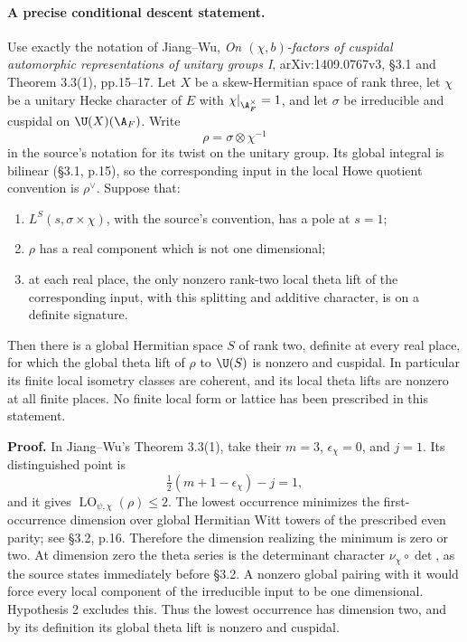 \documentclass[11pt]{article}
\theoremstyle{definition}\newtheorem{definition}[theorem]{Definition}\newtheorem{remark}[theorem]{Remark}
\begin{document}
\paragraph{A precise conditional descent statement.}
Use exactly the notation of Jiang--Wu, \emph{On $(\chi,b)$-factors of cuspidal automorphic representations of unitary groups I}, arXiv:1409.0767v3, \S3.1 and Theorem 3.3(1), pp.15--17. Let $X$ be a skew-Hermitian space of rank three, let $\chi$ be a unitary Hecke character of $E$ with $\chi|_{\A_F^\times}=1$, and let $\sigma$ be irreducible and cuspidal on $\U(X)(\A_F)$. Write
\[
 \rho=\sigma\otimes\chi^{-1}
 \tag{B16a}
\]
in the source's notation for its twist on the unitary group. Its global integral is bilinear (\S3.1, p.15), so the corresponding input in the local Howe quotient convention is $\rho^\vee$. Suppose that:
\begin{enumerate}
\item $L^S(s,\sigma\times\chi)$, with the source's convention, has a pole at $s=1$;
\item $\rho$ has a real component which is not one dimensional;
\item at each real place, the only nonzero rank-two local theta lift of the corresponding input, with this splitting and additive character, is on a definite signature.
\end{enumerate}
Then there is a global Hermitian space $S$ of rank two, definite at every real place, for which the global theta lift of $\rho$ to $\U(S)$ is nonzero and cuspidal. In particular its finite local isometry classes are coherent, and its local theta lifts are nonzero at all finite places. No finite local form or lattice has been prescribed in this statement.

\textbf{Proof.}
In Jiang--Wu's Theorem 3.3(1), take their $m=3$, $\epsilon_\chi=0$, and $j=1$. Its distinguished point is
\[
 \tfrac12(m+1-\epsilon_\chi)-j=1,
\]
and it gives $\operatorname{LO}_{\psi,\chi}(\rho)\leq2$. The lowest occurrence minimizes the first-occurrence dimension over global Hermitian Witt towers of the prescribed even parity; see \S3.2, p.16. Therefore the dimension realizing the minimum is zero or two. At dimension zero the theta series is the determinant character $\nu_\chi\circ\det$, as the source states immediately before \S3.2. A nonzero global pairing with it would force every local component of the irreducible input to be one dimensional. Hypothesis 2 excludes this. Thus the lowest occurrence has dimension two, and by its definition its global theta lift is nonzero and cuspidal.
\end{document}
